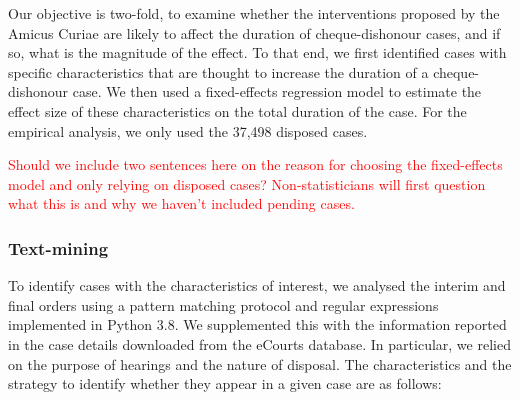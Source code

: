 Our objective is two-fold, to examine whether the interventions proposed by the Amicus Curiae are likely to affect the duration of cheque-dishonour cases, and if so, what is the magnitude of the effect. To that end, we first identified cases with specific characteristics that are thought to increase the duration of a cheque-dishonour case. We then used a fixed-effects regression model to estimate the effect size of these characteristics on the total duration of the case. For the empirical analysis, we only used the 37,498 disposed cases.

\textcolor{red}{Should we include two sentences here on the reason for choosing the fixed-effects model and only relying on disposed cases? Non-statisticians will first question what this is and why we haven't included pending cases.}

\subsubsection{Text-mining} \label{sec:text-mining}

To identify cases with the characteristics of interest, we analysed the interim and final orders using a pattern matching protocol and regular expressions implemented in Python 3.8. We supplemented this with the information reported in the case details downloaded from the eCourts database. In particular, we relied on the purpose of hearings and the nature of disposal. The characteristics and the strategy to identify whether they appear in a given case are as follows:

